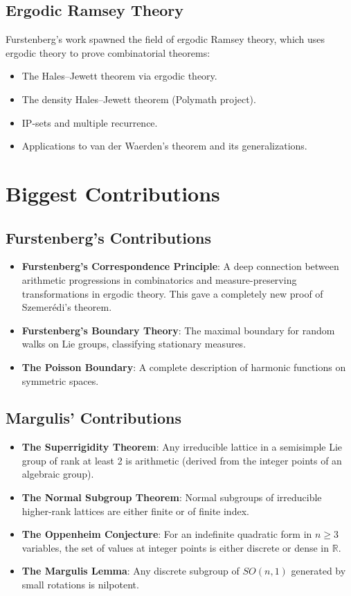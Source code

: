 \subsection{Ergodic Ramsey Theory}

Furstenberg's work spawned the field of ergodic Ramsey theory, which uses ergodic theory to prove combinatorial theorems:
\begin{itemize}
\item The Hales--Jewett theorem via ergodic theory.
\item The density Hales--Jewett theorem (Polymath project).
\item IP-sets and multiple recurrence.
\item Applications to van der Waerden's theorem and its generalizations.
\end{itemize}

\section{Biggest Contributions}

\subsection{Furstenberg's Contributions}
\begin{itemize}
\item \textbf{Furstenberg's Correspondence Principle}: A deep connection between arithmetic progressions in combinatorics and measure-preserving transformations in ergodic theory. This gave a completely new proof of Szemer\'edi's theorem.
\item \textbf{Furstenberg's Boundary Theory}: The maximal boundary for random walks on Lie groups, classifying stationary measures.
\item \textbf{The Poisson Boundary}: A complete description of harmonic functions on symmetric spaces.
\end{itemize}

\subsection{Margulis' Contributions}
\begin{itemize}
\item \textbf{The Superrigidity Theorem}: Any irreducible lattice in a semisimple Lie group of rank at least 2 is arithmetic (derived from the integer points of an algebraic group).
\item \textbf{The Normal Subgroup Theorem}: Normal subgroups of irreducible higher-rank lattices are either finite or of finite index.
\item \textbf{The Oppenheim Conjecture}: For an indefinite quadratic form in $n \geq 3$ variables, the set of values at integer points is either discrete or dense in $\mathbb{R}$.
\item \textbf{The Margulis Lemma}: Any discrete subgroup of $SO(n,1)$ generated by small rotations is nilpotent.
\end{itemize}


